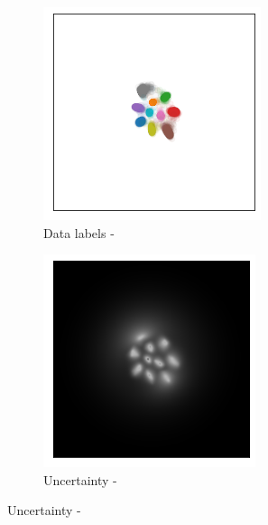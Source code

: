 \begin{figure}[ht!]
\begin{subfigure}[t]{0.23\columnwidth}
    \end{subfigure}%
    \begin{subfigure}[t]{0.23 \columnwidth}
        \centering
        \includegraphics[width=0.8 \textwidth]{sections/006_neurips2020/figures/2D_latent_ours_bn_2.png}
         \caption{Data labels - \PostNetacro}
         \label{ours_visualization_2D}
    \end{subfigure}%
    \begin{subfigure}[t]{0.23\columnwidth}
        \centering
        \includegraphics[width=0.8 \textwidth]{sections/006_neurips2020/figures/2D_latent_ours_bn_1.png}
        \caption{Uncertainty - \PostNetacro}

\end{subfigure}
\end{figure}
